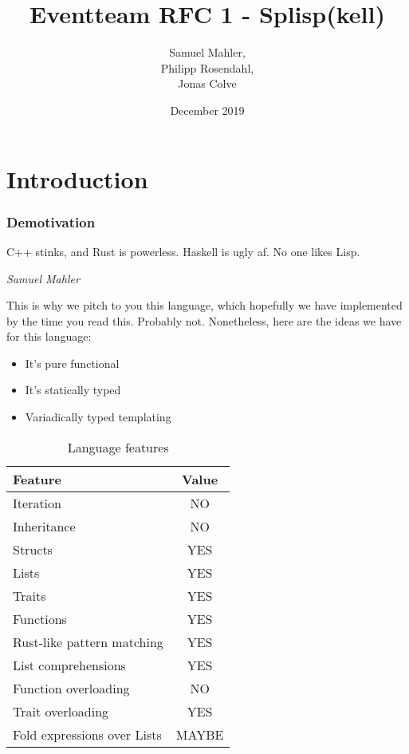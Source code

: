 \documentclass{scrartcl}
\title{Eventteam RFC 1 - Splisp(kell)}
\author{Samuel Mahler, \\
        Philipp Rosendahl, \\
        Jonas Colve}
\date{December 2019}
\begin{document}
\maketitle

\newpage

\tableofcontents

\newpage

\part{Introduction}

\section{Demotivation}

\epigraph{C++ stinks, and Rust is powerless. Haskell is ugly af. No one likes Lisp.}{\textit{Samuel Mahler}}

This is why we pitch to you this language, which hopefully we have implemented by the time you read this. Probably not. Nonetheless, here are the ideas we have for this language:

\begin{itemize}
    \item It's pure functional
    \item It's statically typed
    \item Variadically typed templating
\end{itemize}

\begin{table}[H]
    \centering
    \begin{tabular}{l|c}
        Feature                     & Value \\ \hline
        Iteration                   & NO    \\
        Inheritance                 & NO    \\
        Structs                     & YES   \\
        Lists                       & YES   \\
        Traits                      & YES   \\
        Functions                   & YES   \\
        Rust-like pattern matching  & YES   \\
        List comprehensions         & YES   \\
        Function overloading        & NO    \\
        Trait overloading           & YES\footnotemark   \\
        Fold expressions over Lists & MAYBE
    \end{tabular}
    \caption{Language features}
\end{table}
\end{document}
